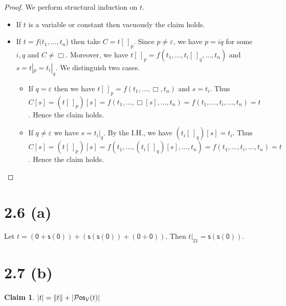 \documentclass[autodetect-engine]{article}
\newcommand{\VV}{\mathcal{V}}
\theoremstyle{plain}
\theoremstyle{definition}
\theoremstyle{definition}
\newtheorem*{claim}{Claim}
\newcommand{\m}[1]{\mathsf{#1}}
\begin{document}
\begin{proof}
    We perform structural induction on $t$.
    \begin{itemize}
        \item If $t$ is a variable or constant then vacuously the claim holds.
        \item If $t = f(t_1,\dots, t_n$) then take $C = t[\,]_p$.
        Since $p \neq \varepsilon$, we have $p = iq$ for some $i,q$ and $C \neq \Box$.
        Moreover, we have $t[\,]_p = f(t_1, \dots, t_i[\,]_q,\dots, t_n)$ and $s = t|_p = t_i|_q$.
        We distinguish two cases.
        \begin{itemize}
            \item If $q=\varepsilon$ then we have $t[\,]_p = f(t_1,\dots,\Box,t_n)$ and $s = t_i$.
                Thus $C[s] = (t[\,]_p)[s] = f(t_1,\dots,\Box[s],\dots,t_n) = f(t_1,\dots,t_i,\dots,t_n) = t$.
                Hence the claim holds.
            \item If $q \neq \varepsilon$ we have $s = t_i|_q$. By the I.H., we have $(t_i[\,]_q)[s] = t_i$.
                Thus $C[s] = (t[\,]_p)[s] = f(t_1,\dots,(t_i[\,]_q)[s],\dots,t_n) = f(t_1,\dots,t_i,\dots,t_n) = t$.
                Hence the claim holds.
        \end{itemize}
    \end{itemize}
\end{proof}

\section*{2.6 (a)}

Let $t = (\m{0} + \m{s}(\m{0})) + (\m{s}(\m{s}(\m{0})) + (\m{0} + \m{0}))$.
Then $t|_{21} = \m{s}(\m{s}(\m{0}))$.

\section*{2.7 (b)}

\begin{claim}
    $|t| = \|t\| + |\Pos_\VV(t)|$
\end{claim}
\end{document}
